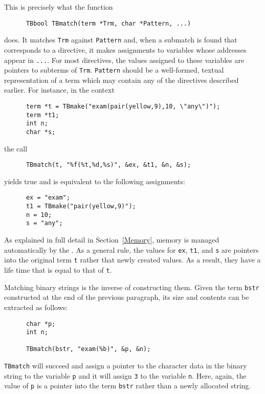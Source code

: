 \noindent This is precisely what the function
\begin{verbatim}
      TBbool TBmatch(term *Trm, char *Pattern, ...)
\end{verbatim}
does. It matches {\tt Trm} against {\tt Pattern} and, when a submatch
is found that corresponds to a directive, it makes assignments to
variables whose addresses appear in {\tt ...}.
For most directives, the values assigned to these variables are pointers to
subterms of {\tt Trm}.
{\tt Pattern} should
be a well-formed, textual representation of a term which may contain
any of the directives described earlier.  For instance, in the context
\begin{verbatim}
      term *t = TBmake("exam(pair(yellow,9),10, \"any\")");
      term *t1;
      int n;
      char *s;
\end{verbatim}
the call 
\begin{verbatim}
      TBmatch(t, "%f(%t,%d,%s)", &ex, &t1, &n, &s);
\end{verbatim}
yields true and is equivalent to the following assignments:
\begin{verbatim}
      ex = "exam";
      t1 = TBmake("pair(yellow,9)");
      n = 10;
      s = "any";
\end{verbatim}
As explained in full detail in Section~\ref{Memory}, memory is managed
automatically by the \TB.  As a general rule, the values for {\tt ex},
{\tt t1}, and {\tt s} are pointers into the original term {\tt t}
rather that newly created values. As a result, they have a life time
that is equal to that of {\tt t}.

Matching binary strings is the inverse of constructing them. Given
the term {\tt bstr} constructed at the end of the previous paragraph,
its size and contents can be extracted as follows:
\begin{verbatim}
      char *p;
      int n;

      TBmatch(bstr, "exam(%b)", &p, &n);
\end{verbatim}
{\tt TBmatch} will succeed and assign a pointer to the character data
in the binary string to the variable 
{\tt p} and it will assign {\tt 3} to the variable {\tt n}.
Here, again, the value of {\tt p} is a pointer into the term {\tt bstr}
rather than a newly allocated string.

